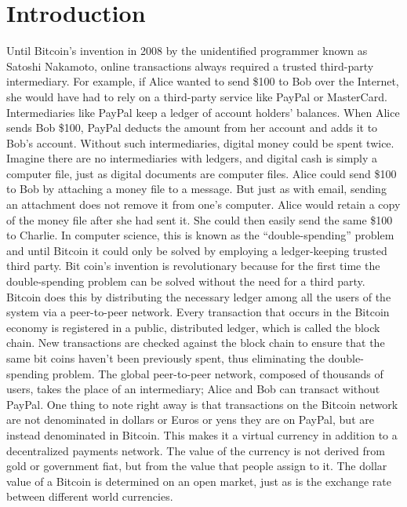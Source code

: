 \chapter{Introduction}
%
%
Until Bitcoin’s invention in 2008 by the unidentified programmer known as Satoshi Nakamoto, online 
transactions always required a trusted third-party intermediary\cite{nakamoto2012bitcoin}. For example, if Alice wanted to send \$100 to Bob over the Internet, she would have had to rely on a third-party service like PayPal or MasterCard. Intermediaries like PayPal keep a ledger of account holders’ balances. When Alice sends Bob \$100, 
PayPal deducts the amount from her account and adds it to Bob’s account. Without such intermediaries, 
digital money could be spent twice. Imagine there are no intermediaries with ledgers, and digital cash 
is simply a computer file, just as digital documents are computer files. Alice could send \$100 to Bob 
by attaching a money file to a message. But just as with email, sending an attachment does not remove 
it from one’s computer. Alice would retain a copy of the money file after she had sent it. She could 
then easily send the same \$100 to Charlie. In computer science, this is known as the “double-spending” 
problem and until Bitcoin it could only be solved by employing a ledger-keeping trusted third party. Bit 
coin’s invention is revolutionary because for the first time the double-spending problem can be solved 
without the need for a third party. Bitcoin does this by distributing the necessary ledger among all the 
users of the system via a peer-to-peer network. Every transaction that occurs in the Bitcoin economy is 
registered in a public, distributed ledger, which is called the block chain. New transactions are checked 
against the block chain to ensure that the same bit coins haven’t been previously spent, thus eliminating 
the double-spending problem. The global peer-to-peer network, composed of thousands of users, takes the 
place of an intermediary; Alice and Bob can transact without PayPal. One thing to note right away is that 
transactions on the Bitcoin network are not denominated in dollars or Euros or yens they are on PayPal, 
but are instead denominated in Bitcoin. This makes it a virtual currency in addition to a decentralized 
payments network. The value of the currency is not derived from gold or government fiat, but from the 
value that people assign to it\cite{abramowitzstegun}. The dollar value of a Bitcoin is determined on an open market, just as is the 
exchange rate between different world currencies.


